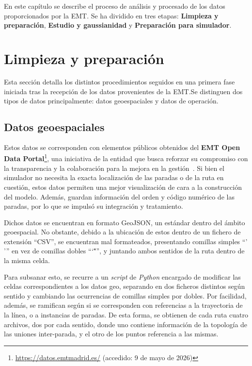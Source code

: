 En este capítulo se describe el proceso de análisis y procesado de los datos proporcionados por la EMT.\@
Se ha dividido en tres etapas: \textbf{Limpieza y preparación}, \textbf{Estudio y gaussianidad} y 
\textbf{Preparación para simulador}.


\section{Limpieza y preparación}
Esta sección detalla los distintos procedimientos seguidos en una primera fase iniciada tras la recepción
de los datos provenientes de la EMT.\@ Se distinguen dos tipos de datos principalmente:
datos geoespaciales y datos de operación.


\subsection{Datos geoespaciales}
Estos datos se corresponden con elementos públicos obtenidos del \textbf{EMT Open Data Portal}\footnote{
\url{https://datos.emtmadrid.es/} (accedido: 9 de mayo de 2026)}, una iniciativa
de la entidad que busca reforzar su compromiso con la transparencia y la colaboración para la mejora
en la gestión~\cite{balaguer2018}. Si bien el simulador no necesita la exacta localización de las 
paradas o de la ruta en cuestión, estos datos permiten una mejor visualización de cara a la construcción
del modelo. Además, guardan información del orden y código numérico de las paradas, por lo que
se impulsó su integración y tratamiento.


Dichos datos se encuentran en formato GeoJSON, un estándar dentro del ámbito geoespacial. No obstante,
debido a la ubicación de estos dentro de un fichero de extensión \enquote{CSV}, se encuentran
mal formateados, presentando comillas simples \enquote{' '} en vez de comillas dobles 
\enquote{\char`\"  "}, y juntando ambos sentidos de la ruta dentro de la misma celda.

Para subsanar esto, se recurre a un \textit{script} de \textit{Python} encargado de modificar las celdas 
correspondientes a los datos geo, separando en dos ficheros distintos según sentido y cambiando las 
ocurrencias de comillas simples por dobles. Por facilidad, además, se ramifican según si se 
corresponden con referencias a la trayectoria de la línea, o a instancias de paradas. 
De esta forma, se obtienen de cada ruta cuatro archivos, dos por cada sentido, donde uno
contiene información de la topología de las uniones inter-parada, y el otro de los puntos referencia a 
las mismas.


